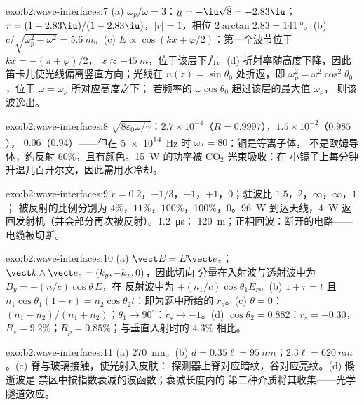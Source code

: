 \begin{solution}{exo:b2:wave-interfaces:7}
(a) $\omega_p/\omega = 3$：$\underline n = -\iu\sqrt8 = -2.83\iu$；$r = (1 + 2.83\iu)/(1 - 2.83
\iu)$，$|r| = 1$，相位 $2\arctan2.83 = \qty{141}{\degree}$。(b) $c/\sqrt{\omega_p^2 - \omega^2}
= \qty{5.6}{m}$。(c) $E \propto \cos(kx + \varphi/2)$：第一个波节位于 $kx = -(\pi + \varphi)/2$，
$x \approx \qty{-45}{m}$，位于该层下方。(d) 折射率随高度下降，因此
笛卡儿使光线偏离竖直方向；光线在
$n(z) = \sin\theta_0$ 处折返，即 $\omega_p^2 = \omega^2\cos^2\theta_0$，位于 $\omega = \omega_p$ 所对应高度之下；
若频率的 $\omega\cos\theta_0$ 超过该层的最大值 $\omega_p$，
则该波逸出。
\end{solution}

\begin{solution}{exo:b2:wave-interfaces:8}
$\sqrt{8\varepsilon_0\omega/\gamma}$：$2.7 \times 10^{-4}$（$R = 0.9997$），$1.5 \times 10^{-2}$（$0.985$），
$0.06$（$0.94$）——但在 \qty{5e14}{Hz} 时 $\omega\tau = 80$：铜是等离子体，
不是欧姆导体，约反射 $60\%$，且有颜色。\qty{15}{W}
的功率被 CO$_2$ 光束吸收：在
小镜子上每分钟升温几百开尔文，因此需用水冷却。
\end{solution}

\begin{solution}{exo:b2:wave-interfaces:9}
$r = 0.2$，$-1/3$，$-1$，$+1$，$0$；驻波比 $1.5$，$2$，$\infty$，$\infty$，$1$；
被反射的比例分别为 $4\%$，$11\%$，$100\%$，$100\%$，$0$。\qty{96}{W} 到达天线，\qty{4}{W}
返回发射机（并会部分再次被反射）。\qty{1.2}{\micro s}：
\qty{120}{m}；正相回波：断开的电路——电缆被切断。
\end{solution}

\begin{solution}{exo:b2:wave-interfaces:10}
(a) $\vect E = E\vect e_z$；$\vect k\wedge\vect e_z = (k_y, -k_x, 0)$，因此切向
分量在入射波与透射波中为 $B_y = -(n/c)\cos\theta\,E$，在
反射波中为 $+(n_1/c)\cos\theta_1E_r$。(b) $1 + r = t$ 且 $n_1\cos\theta_1
(1 - r) = n_2\cos\theta_2t$：即为题中所给的 $r_s$。(c) $\theta = 0$：$(n_1 - n_2)/(n_1 +
n_2)$；$\theta_1 \to 90^\circ$：$r_s \to -1$。(d) $\cos\theta_2 = 0.882$：$r_s = -0.30$，$R_s =
9.2\%$；$R_p = 0.85\%$；与垂直入射时的 $4.3\%$ 相比。
\end{solution}

\begin{solution}{exo:b2:wave-interfaces:11}
(a) \qty{270}{nm}。(b) $d = 0.35\ell = \qty{95}{nm}$；$2.3\ell = \qty{620}{nm}$。(c)
脊与玻璃接触，使光射入皮肤：
探测器上脊对应暗纹，谷对应亮纹。(d) 倏逝波是
禁区中按指数衰减的波函数；衰减长度内的
第二种介质将其收集——光学隧道效应。
\end{solution}

